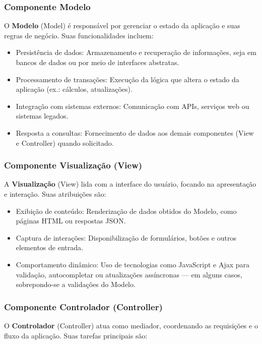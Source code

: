         \subsubsection{Componente Modelo}
        
            \par O \textbf{Modelo} (Model) é responsável por gerenciar o estado da aplicação e suas regras de negócio. Suas funcionalidades incluem:
        
            \begin{itemize}
                \item Persistência de dados: Armazenamento e recuperação de informações, seja em bancos de dados ou por meio de interfaces abstratas.
                \item Processamento de transações: Execução da lógica que altera o estado da aplicação (ex.: cálculos, atualizações).
                \item Integração com sistemas externos: Comunicação com APIs, serviços web ou sistemas legados.
                \item Resposta a consultas: Fornecimento de dados aos demais componentes (View e Controller) quando solicitado.
            \end{itemize}
        
        \subsubsection{Componente Visualização (View)}
            \par A \textbf{Visualização} (View) lida com a interface do usuário, focando na apresentação e interação. Suas atribuições são:
        
            \begin{itemize}
                \item Exibição de conteúdo: Renderização de dados obtidos do Modelo, como páginas HTML ou respostas JSON.
                \item Captura de interações: Disponibilização de formulários, botões e outros elementos de entrada.
                \item Comportamento dinâmico: Uso de tecnologias como JavaScript e Ajax para validação, autocompletar ou atualizações assíncronas — em alguns casos, sobrepondo-se a validações do Modelo.
            \end{itemize}
        
            \subsubsection{Componente Controlador (Controller)}
                \par O \textbf{Controlador} (Controller) atua como mediador, coordenando as requisições e o fluxo da aplicação. Suas tarefas principais são:
        
